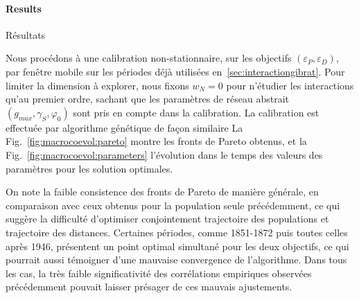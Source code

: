 




\paragraph{Results}{Résultats}


Nous procédons à une calibration non-stationnaire, sur les objectifs $(\varepsilon_P,\varepsilon_D)$, par fenêtre mobile sur les périodes déjà utilisées en~\ref{sec:interactiongibrat}. Pour limiter la dimension à explorer, nous fixons $w_N = 0$ pour n'étudier les interactions qu'au premier ordre, sachant que les paramètres de réseau abstrait $(g_{max},\gamma_S,\varphi_0)$ sont pris en compte dans la calibration. La calibration est effectuée par algorithme génétique de façon similaire La Fig.~\ref{fig:macrocoevol:pareto} montre les fronts de Pareto obtenus, et la Fig.~\ref{fig:macrocoevol:parameters} l'évolution dans le temps des valeurs des paramètres pour les solution optimales.


On note la faible consistence des fronts de Pareto de manière générale, en comparaison avec ceux obtenus pour la population seule précédemment, ce qui suggère la difficulté d'optimiser conjointement trajectoire des populations et trajectoire des distances. Certaines périodes, comme 1851-1872 puis toutes celles après 1946, présentent un point optimal simultané pour les deux objectifs, ce qui pourrait aussi témoigner d'une mauvaise convergence de l'algorithme. Dans tous les cas, la très faible significativité des corrélations empiriques observées précédemment pouvait laisser présager de ces mauvais ajustements.


